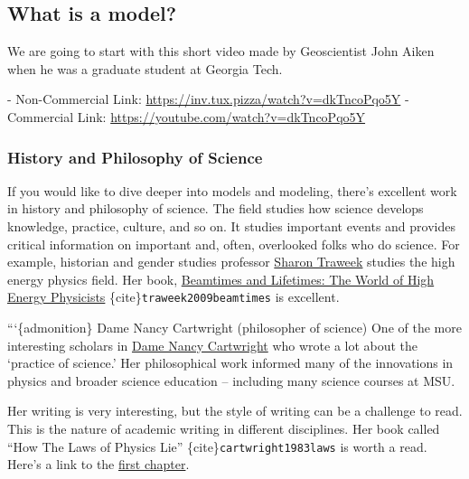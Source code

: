 \subsection{What is a model?}\label{what-is-a-model}

We are going to start with this short video made by Geoscientist John
Aiken when he was a graduate student at Georgia Tech.

\href{https://inv.tux.pizza/watch?v=dkTncoPqo5Y}{\pandocbounded{\texttt{[image: https://markdown-videos-api.jorgenkh.no/youtube/dkTncoPqo5Y?width=720\&height=405]}}}
- Non-Commercial Link: \url{https://inv.tux.pizza/watch?v=dkTncoPqo5Y} -
Commercial Link: \url{https://youtube.com/watch?v=dkTncoPqo5Y}

\subsubsection{History and Philosophy of
Science}\label{history-and-philosophy-of-science}

If you would like to dive deeper into models and modeling, there's
excellent work in history and philosophy of science. The field studies
how science develops knowledge, practice, culture, and so on. It studies
important events and provides critical information on important and,
often, overlooked folks who do science. For example, historian and
gender studies professor
\href{https://en.wikipedia.org/wiki/Sharon_Traweek}{Sharon Traweek}
studies the high energy physics field. Her book,
\href{https://en.wikipedia.org/wiki/Beamtimes_and_Lifetimes}{Beamtimes
and Lifetimes: The World of High Energy Physicists}
\{cite\}\texttt{traweek2009beamtimes} is excellent.

```\{admonition\} Dame Nancy Cartwright (philosopher of science) One of
the more interesting scholars in
\href{https://en.wikipedia.org/wiki/Nancy_Cartwright_(philosopher)}{Dame
Nancy Cartwright} who wrote a lot about the `practice of science.' Her
philosophical work informed many of the innovations in physics and
broader science education -- including many science courses at MSU.

Her writing is very interesting, but the style of writing can be a
challenge to read. This is the nature of academic writing in different
disciplines. Her book called ``How The Laws of Physics Lie''
\{cite\}\texttt{cartwright1983laws} is worth a read. Here's a link to
the
\href{http://www.generativescience.org/papers/nature/Cartwright-_1983.pdf}{first
chapter}.

